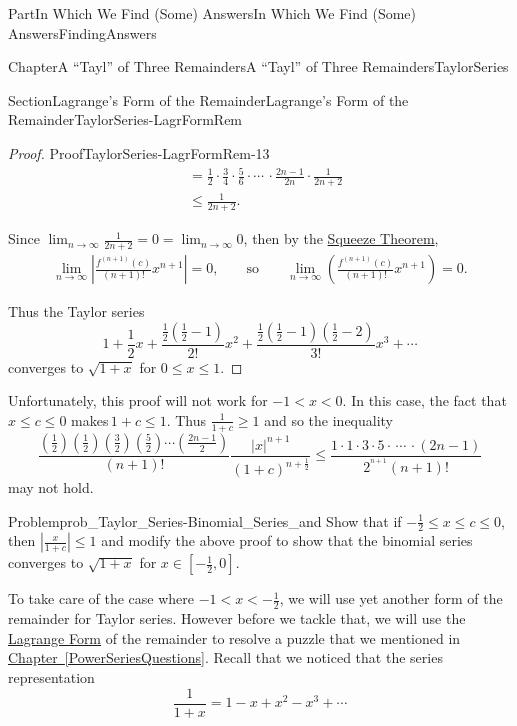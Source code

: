 \documentclass[oneside,10pt,]{book}
\newcommand{\xreffont}{\relax}
\numberwithin{equation}{part}
\newcommand{\abs}[1]{\left|#1\right|}
\def\limit#1#2#3{{\displaystyle\lim_{#1\rightarrow #2}#3}}
\def\limitt#1#2#3{{\displaystyle\lim_{#1\rightarrow #2}\textstyle #3}}
\newcommand{\lt}{<}
\newcommand{\amp}{&}
\begin{document}
\begin{partptx}{Part}{In Which We Find (Some) Answers}{}{In Which We Find (Some) Answers}{}{}{FindingAnswers}
\begin{chapterptx}{Chapter}{A ``Tayl'' of Three Remainders}{}{A ``Tayl'' of Three Remainders}{}{}{TaylorSeries}
\begin{sectionptx}{Section}{Lagrange's Form of the Remainder}{}{Lagrange's Form of the Remainder}{}{}{TaylorSeries-LagrFormRem}
\begin{proof}{Proof}{}{TaylorSeries-LagrFormRem-13}
\begin{align*}
\amp =\frac{1}{2}\cdot\frac{3}{4}\cdot\frac{5}{6}\cdot\cdots\,\cdot\frac{2n-1}{2n}\cdot\frac{1}{2n+2}\\
\amp \leq\frac{1}{2n+2}\text{.}
\end{align*}
%
\par
Since \(\limitt{n}{\infty}{\frac{1}{2n+2}}=0=\limitt{n}{\infty}{0}\), then by the \hyperref[thm_SqueezeTheorem]{Squeeze Theorem},%
\begin{align*}
\limit{n}{\infty}{\abs{\frac{f^{(n+1)}(c)}{(n+1)!}x^{n+1}}}=0, \amp{}\amp{}\text{ so } \amp{}\amp{}\limit{n}{\infty}{\left(\frac{f^{(n+1)}(c)}{(n+1)!}x^{n+1}\right)}=0.
\end{align*}
%
\par
Thus the Taylor series%
\begin{equation*}
1+\frac{1}{2}x+\frac{\frac{1}{2}\left(\frac{1}{2}-1\right)}{2!}x^2+\frac{\frac{1}{2}\left(\frac{1}{2}-1\right)\left(\frac{1}{2}-2\right)}{3!}x^3+\cdots
\end{equation*}
converges to \(\sqrt{1+x}\) for \(0\leq x\leq 1\).%
\end{proof}
Unfortunately, this proof will not work for \(-1\lt x\lt 0\). In this case, the fact that \(x\leq c\leq 0\) makes\(\,1+c\leq 1\). Thus \(\frac{1}{1+c}\geq 1\) and so the inequality%
\begin{equation*}
\frac{\left(\frac{1}{2}\right)\left(\frac{1}{2}\right)\left(\frac{3}{2}\right)\left(\frac{5}{2}\right)\cdots\left(\frac{2n-1}{2}\right)}{(n+1)!}\frac{|x|^{n+1}}{(1+c)^{n+\frac{1}{2}}}\leq\frac{1\cdot 1\cdot 3\cdot 5\cdot\,\cdots\,\cdot\left(2n-1\right)}{2^{^{n+1}}(n+1)!}
\end{equation*}
may not hold.%
\begin{problem}{Problem}{}{prob_Taylor_Series-Binomial_Series_and}%
Show that if \(-\frac{1}{2}\leq x\leq c\leq 0\), then \(|\frac{x}{1+c}|\leq 1\) and modify the above proof to show that the binomial series converges to \(\sqrt{1+x}\) for \(x\in\left[-\frac{1}{2},0\right]\).%
\end{problem}
To take care of the case where \(-1\lt x\lt -\frac{1}{2}\), we will use yet another form of the remainder for Taylor series. However before we tackle that, we will use the \hyperref[thm_LagrangeRemainder]{Lagrange Form} of the remainder to resolve a puzzle that we mentioned in \hyperref[PowerSeriesQuestions]{Chapter~{\xreffont\ref{PowerSeriesQuestions}}}.  Recall that we noticed that the series representation%
\begin{equation*}
\frac{1}{1+x}=1-x+x^2-x^3+\cdots
\end{equation*}

\end{sectionptx}
\end{chapterptx}
\end{partptx}
\end{document}
